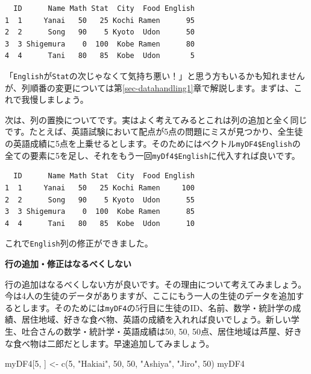 \documentclass[
  a4paper,
  pandoc,
  ja=standard,
  jafont=haranoaji]{bxjsbook}
\newenvironment{Shaded}{\begin{snugshade}}{\end{snugshade}}
\newcommand{\DecValTok}[1]{\textcolor[rgb]{0.68,0.00,0.00}{#1}}
\newcommand{\FunctionTok}[1]{\textcolor[rgb]{0.28,0.35,0.67}{#1}}
\newcommand{\NormalTok}[1]{\textcolor[rgb]{0.00,0.48,0.65}{#1}}
\newcommand{\OtherTok}[1]{\textcolor[rgb]{0.00,0.48,0.65}{#1}}
\newcommand{\SpecialCharTok}[1]{\textcolor[rgb]{0.37,0.37,0.37}{#1}}
\newcommand{\StringTok}[1]{\textcolor[rgb]{0.13,0.47,0.30}{#1}}
\begin{document}
\begin{verbatim}
  ID      Name Math Stat  City  Food English
1  1     Yanai   50   25 Kochi Ramen      95
2  2      Song   90    5 Kyoto  Udon      50
3  3 Shigemura    0  100  Kobe Ramen      80
4  4      Tani   80   85  Kobe  Udon       5
\end{verbatim}

「\texttt{English}が\texttt{Stat}の次じゃなくて気持ち悪い！」と思う方もいるかも知れませんが、列順番の変更については第\ref{sec-datahandling1}章で解説します。まずは、これで我慢しましょう。

次は、列の置換についてです。実はよく考えてみるとこれは列の追加と全く同じです。たとえば、英語試験において配点が5点の問題にミスが見つかり、全生徒の英語成績に5点を上乗せるとします。そのためにはベクトル\texttt{myDF4\$English}の全ての要素に5を足し、それをもう一回\texttt{myDf4\$English}に代入すれば良いです。

\begin{Shaded}
\end{Shaded}

\begin{verbatim}
  ID      Name Math Stat  City  Food English
1  1     Yanai   50   25 Kochi Ramen     100
2  2      Song   90    5 Kyoto  Udon      55
3  3 Shigemura    0  100  Kobe Ramen      85
4  4      Tani   80   85  Kobe  Udon      10
\end{verbatim}

これで\texttt{English}列の修正ができました。

\textbf{行の追加・修正はなるべくしない}

行の追加はなるべくしない方が良いです。その理由について考えてみましょう。今は4人の生徒のデータがありますが、ここにもう一人の生徒のデータを追加するとします。そのためには\texttt{myDF4}の5行目に生徒のID、名前、数学・統計学の成績、居住地域、好きな食べ物、英語の成績を入れれば良いでしょう。新しい学生、吐合さんの数学・統計学・英語成績は50,
50,
50点、居住地域は芦屋、好きな食べ物は二郎だとします。早速追加してみましょう。

\begin{Shaded}
\begin{Highlighting}[numbers=left,,]
\NormalTok{myDF4[}\DecValTok{5}\NormalTok{, ] }\OtherTok{\textless{}{-}} \FunctionTok{c}\NormalTok{(}\DecValTok{5}\NormalTok{, }\StringTok{"Hakiai"}\NormalTok{, }\DecValTok{50}\NormalTok{, }\DecValTok{50}\NormalTok{, }\StringTok{"Ashiya"}\NormalTok{, }\StringTok{"Jiro"}\NormalTok{, }\DecValTok{50}\NormalTok{)}
\NormalTok{myDF4}
\end{Highlighting}
\end{Shaded}
\end{document}
